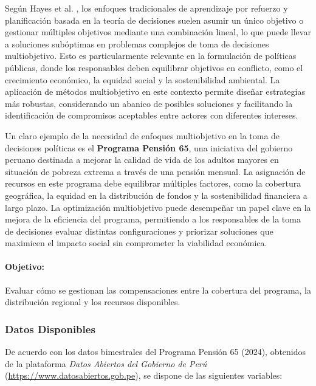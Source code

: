 \documentclass[12pt]{article}
\begin{document}
Según Hayes et al. \cite{Hayes2022}, los enfoques tradicionales de aprendizaje por refuerzo y planificación basada en la teoría de decisiones suelen asumir un único objetivo o gestionar múltiples objetivos mediante una combinación lineal, lo que puede llevar a soluciones subóptimas en problemas complejos de toma de decisiones multiobjetivo. Esto es particularmente relevante en la formulación de políticas públicas, donde los responsables deben equilibrar objetivos en conflicto, como el crecimiento económico, la equidad social y la sostenibilidad ambiental. La aplicación de métodos multiobjetivo en este contexto permite diseñar estrategias más robustas, considerando un abanico de posibles soluciones y facilitando la identificación de compromisos aceptables entre actores con diferentes intereses.

Un claro ejemplo de la necesidad de enfoques multiobjetivo en la toma de decisiones políticas es el \textbf{Programa Pensión 65}, una iniciativa del gobierno peruano destinada a mejorar la calidad de vida de los adultos mayores en situación de pobreza extrema a través de una pensión mensual. La asignación de recursos en este programa debe equilibrar múltiples factores, como la cobertura geográfica, la equidad en la distribución de fondos y la sostenibilidad financiera a largo plazo. La optimización multiobjetivo puede desempeñar un papel clave en la mejora de la eficiencia del programa, permitiendo a los responsables de la toma de decisiones evaluar distintas configuraciones y priorizar soluciones que maximicen el impacto social sin comprometer la viabilidad económica.


\paragraph{Objetivo:}  
Evaluar cómo se gestionan las compensaciones entre la cobertura del programa, la distribución regional y los recursos disponibles.

\subsubsection{Datos Disponibles}
De acuerdo con los datos bimestrales del Programa Pensión 65 (2024), obtenidos de la plataforma \textit{Datos Abiertos del Gobierno de Perú} (\url{https://www.datosabiertos.gob.pe}), se dispone de las siguientes variables:
\end{document}
